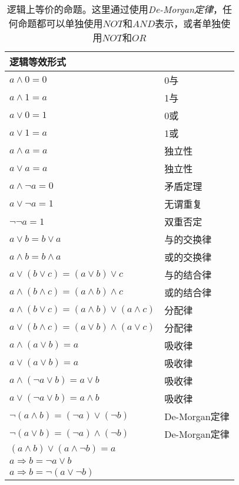 \begin{table}
    \centering
    \caption[De-Morgan定律]{逻辑上等价的命题。这里通过使用\emph{De-Morgan定律}，任何命题都可以单独使用$NOT$和$AND$表示，或者单独使用$NOT$和$OR$}
    \label{tb:de_morgan_law}
    \begin{tabular}[\linewidth]{L{8cm}L{4cm}}
        \toprule
        \textbf{逻辑等效形式} & \\
        \toprule 
        $a\wedge0=0$ & 0与\\
        $a\wedge1=a$ & 1与\\
        $a\vee 0=1$ & 0或\\
        $a\vee 1=a$ & 1或\\
        \midrule 
        $a\wedge a=a$ & 独立性\\
        $a\vee a=a$ & 独立性\\
        $a\wedge \neg a=0$ & 矛盾定理\\
        $a\vee \neg a=1$ & 无谓重复\\
        $ \neg \neg a=1$ & 双重否定\\
        \midrule 
        $a\vee b=b\vee a$ & 与的交换律\\
        $a\wedge b=b\wedge a$ & 或的交换律\\
        $a\vee (b\vee c)=(a\vee b)\vee c$ & 与的结合律\\
        $a\wedge (b\wedge c)=(a\wedge b)\wedge c$ & 或的结合律\\
        $a\wedge (b\vee c)=(a\wedge b)\vee (a\wedge c)$ & 分配律\\
        $a\vee (b\wedge c)=(a\vee b)\wedge (a\vee c)$ & 分配律\\
        \midrule
        $a\wedge (a\vee b)=a$ & 吸收律\\
        $a\vee (a\vee b)=a$ & 吸收律\\
        $a\wedge (\neg a\vee b)=a\vee b$ & 吸收律\\
        $a\vee (\neg a\vee b)=a\wedge b$ & 吸收律\\
        \midrule
        $\neg(a\wedge b)=(\neg a)\vee (\neg b)$ & De-Morgan定律\\
        $\neg(a\vee b)=(\neg a)\wedge (\neg b)$ & De-Morgan定律\\
        $(a\wedge b)\vee(a\wedge \neg b)=a$ & \\
        $a\Longrightarrow b=\neg a \vee b$ & \\
        $a\Longrightarrow b=\neg (a \vee \neg b)$ & \\
        \bottomrule
    \end{tabular}
\end{table}





